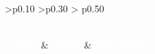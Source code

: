 {
\renewcommand{\arraystretch}{1.5}
\centering
\begin{longtable}{ >{\centering}p{} >{}p{} > {}p{0.50\textwidth}}
\caption{Elenco dei test di sistema}\\
\textcolor{white}{\textbf{Codice}} & \textcolor{white}{\textbf{Titolo}} & \textcolor{white}{\textbf{Descrizione}} \\
    
    
    
\end{longtable}
}
